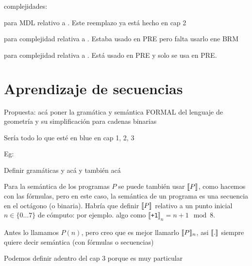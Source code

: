 \documentclass[a4paper,12pt,oneside]{book}
\begin{document}
complejidades:

\mdlbin para MDL relativo a \grambin . Este reemplazo ya está hecho en cap 2

\mdl{\grambool} para complejidad relativa a \grambool. Estaba usado en PRE pero falta usarlo ene BRM

\mdl{\gramboolxor} para complejidad relativa a \gramboolxor. Está usado en PRE y solo se usa en PRE.



    
\restoregeometry 

    
    
    
    
\tableofcontents


\setlength{\parskip}{0.5em}

    

    \part{Aprendizaje de secuencias}
    \color{blue}
    Propuesta: acá poner la gramática y semántica FORMAL del lenguaje de geometría y su simplificación para cadenas binarias

    Sería todo lo que esté en blue en cap 1, 2, 3

    Eg:

    Definir  gramáticas   \gramgeo y    \grambin acá y también \mdlbin acá

    Para la semántica de los programas $P$ se puede también usar $\llbracket P\rrbracket$, como hacemos con las fórmulas, pero en este caso, la semántica de un programa es una secuencia en el octágono (o binaria). Habría que definir $\llbracket P\rrbracket$ relativo a un punto inicial $n\in\{0\dots 7\}$ de cómputo: 
    por ejemplo. algo como $\llbracket$\verb#+1#$\rrbracket_n= n+1 \mod 8$.%

    Antes lo llamamos $P(n)$, pero creo que es mejor llamarlo $\llbracket P\rrbracket_n$, asi $\llbracket .\rrbracket$ siempre quiere decir semántica (con fórmulas o secuencias)

    Podemos definir \mdlbinfrag adentro del cap 3 porque es muy particular
\end{document}
